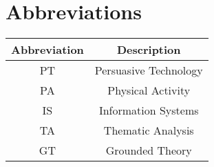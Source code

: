 \chapter*{Abbreviations}

\begin{table}[h]
\begin{tabular}{|c|c|}
\hline
\textbf{Abbreviation} & \textbf{Description} \\ \hline
PT & Persuasive Technology \\ \hline
PA & Physical Activity \\ \hline
IS & Information Systems \\ \hline
TA & Thematic Analysis \\ \hline
GT & Grounded Theory \\ \hline
\end{tabular}
\end{table}
